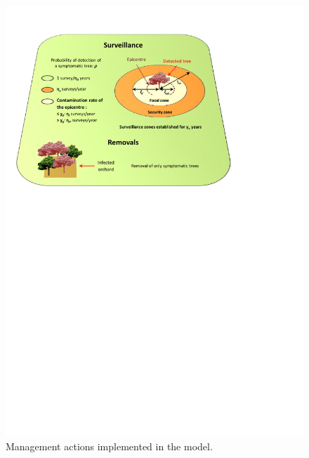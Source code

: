	\begin{figure}[!ht]
		\centering
		\includegraphics[trim = 0cm 16cm 4cm 1cm, clip, width=\textwidth]{Figures_Warping_paras_de_gestion.pdf}
		\caption{Management actions implemented in the model.}\label{fig:schemagestion}
	\end{figure}
	
